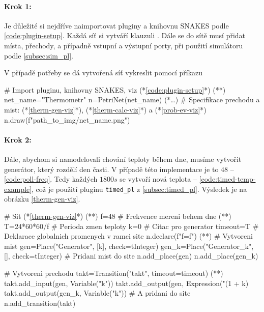 \paragraph{Krok 1:}

Je důležité si nejdříve naimportovat pluginy a knihovnu SNAKES podle \ref{code:plugin-setup}. Každá síť si vytváří klauzuli . Dále se do sítě musí přidat místa, přechody, a případně vstupní a výstupní porty, při použití simulátoru podle \ref{subsec:sim_pl}.

V případě potřeby se dá vytvořená síť vykreslit pomocí příkazu 

\begin{python}
 # Import pluginu, knihovny SNAKES, viz (*\ref{code:plugin-setup}*) (*\label{code:thermometr-draw}*)
 net_name="Thermometr"
 n=PetriNet(net_name)
 (*\ldots*) # Specifikace prechodu a mist: (*\ref{therm-gen-viz}*), (*\ref{therm-calc-viz}*) a (*\ref{prob-ev-viz}*)
 n.draw(f"{path_to_img}/{net_name}.png")
\end{python}

\paragraph{Krok 2:}

Dále, abychom si namodelovali chování teploty během dne, musíme vytvořit generátor, který rozdělí den časti. V případě této implementace je to $48$ -- \ref{code:poll-freq}. Tedy každých $1800s$ se vytvoří nová teplota -- \ref{code:timed-temp-example}, což je použití pluginu \texttt{timed\_pl} z \ref{subsec:timed_pl}. Výsledek je na obrázku \ref{therm-gen-viz}.

\begin{python}
 # Sit (*\ref{therm-gen-viz}*) (*\label{code:gen-therm-draw}*)
 f=48 # Frekvence mereni behem dne (*\label{code:poll-freq}*)
 T=24*60*60/f # Perioda zmen teploty
 k=0 # Citac pro generator
 timeout=T
  # Deklarace globalnich promenych v ramci site
 n.declare(f"f={f}") (*\label{code:snakes-glob-var}*)
  # Vytvoreni mist
 gen=Place("Generator", [k], check=tInteger)
 gen_k=Place("Generator_k", [], check=tInteger)
 # Pridani mist do site
 n.add_place(gen)
 n.add_place(gen_k)

 # Vytvoreni prechodu
 takt=Transition("takt", timeout=timeout) (*\label{code:timed-temp-example}*)
 takt.add_input(gen, Variable("k"))
 takt.add_output(gen, Expression("(1 + k) %
 takt.add_output(gen_k, Variable("k"))
 # A pridani do site
 n.add_transition(takt)
\end{python}

